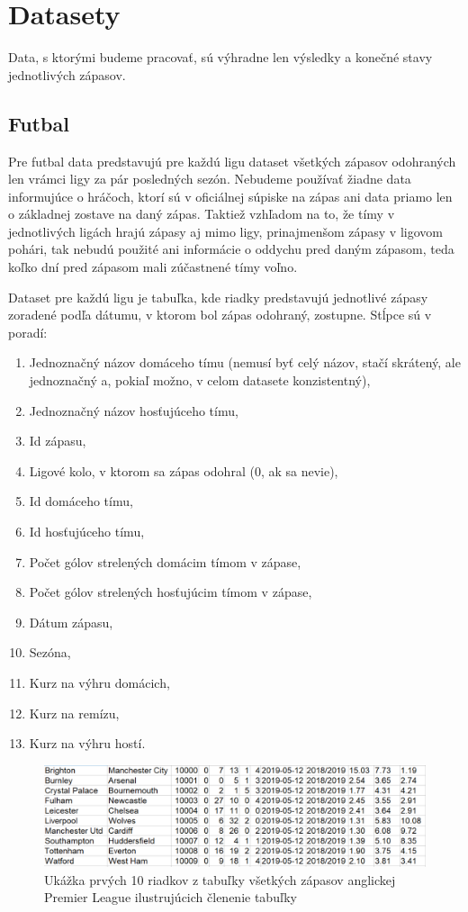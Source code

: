 \chapter{Datasety}

Data, s ktorými budeme pracovať, sú výhradne len výsledky a konečné stavy jednotlivých zápasov. 

\section{Futbal}
Pre futbal data predstavujú pre každú ligu dataset všetkých zápasov odohraných len vrámci ligy za pár posledných sezón. 
Nebudeme používať žiadne data informujúce o hráčoch, ktorí sú v oficiálnej súpiske na zápas ani data priamo len o základnej zostave na daný zápas. 
Taktiež vzhľadom na to, že tímy v jednotlivých ligách hrajú zápasy aj mimo ligy, prinajmenšom zápasy v ligovom pohári, tak nebudú použité ani informácie o oddychu pred daným zápasom, teda koľko dní pred zápasom mali zúčastnené tímy voľno.

Dataset pre každú ligu je tabuľka, kde riadky predstavujú jednotlivé zápasy zoradené podľa dátumu, v ktorom bol zápas odohraný, zostupne.
Stĺpce sú v poradí:
\begin{enumerate}
  \item Jednoznačný názov domáceho tímu (nemusí byť celý názov, stačí skrátený, ale jednoznačný a, pokiaľ možno, v celom datasete konzistentný),
  \item Jednoznačný názov hosťujúceho tímu,
  \item Id zápasu,
  \item Ligové kolo, v ktorom sa zápas odohral (0, ak sa nevie),
  \item Id domáceho tímu,
  \item Id hosťujúceho tímu,
  \item Počet gólov strelených domácim tímom v zápase,
  \item Počet gólov strelených hosťujúcim tímom v zápase,
  \item Dátum zápasu,
  \item Sezóna,
  \item Kurz na výhru domácich,
  \item Kurz na remízu,
  \item Kurz na výhru hostí.
\end{enumerate}

\noindent
\begin{figure}
\includegraphics[width=\textwidth]{../img/eng.png}
\caption{Ukážka prvých 10 riadkov z tabuľky všetkých zápasov anglickej Premier League ilustrujúcich členenie tabuľky}
\end{figure}

